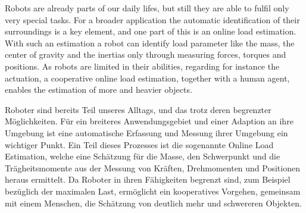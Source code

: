 \documentclass[a4paper,twoside, openright,12pt]{report}
\newenvironment{abstractpage}
  {\vspace*{\fill}\thispagestyle{empty}}
  {\vfill}%
\renewenvironment{abstract}[1]
  {\bigskip\selectlanguage{#1}%
   \begin{center}\bfseries\abstractname\end{center}}
  {\par\bigskip}
\begin{document}
\begin{abstractpage}
	\begin{abstract}{english}
	    Robots are already parts of our daily lifes, but still they are able to fulfil only very special tasks. For a broader application the automatic identification of their surroundings is a key element, and one part of this is an online load estimation. With such an estimation a robot can identify load parameter like the mass, the center of gravity and the inertias only through measuring forces, torques and positions. As robots are limited in their abilities, regarding for instance the actuation, a cooperative online load estimation, together with a human agent, enables the estimation of more and heavier objects.
	\end{abstract}
	\vspace{2cm}
	\begin{abstract}{ngerman}
	    Roboter sind bereits Teil unseres Alltags, und das trotz deren begrenzter M\"oglichkeiten. F\"ur ein breiteres Anwendungsgebiet und einer Adaption an ihre Umgebung ist eine automatische Erfassung und Messung ihrer Umgebung ein wichtiger Punkt. Ein Teil dieses Prozesses ist die sogenannte Online Load Estimation, welche eine Sch\"atzung f\"ur die Masse, den Schwerpunkt und die Tr\"agheitsmomente aus der Messung von Kr\"aften, Drehmomenten und Positionen heraus ermittelt. Da Roboter in ihren F\"ahigkeiten begrenzt sind, zum Beispiel bez\"uglich der maximalen Last, erm\"oglicht ein kooperatives Vorgehen, gemeinsam mit einem Menschen, die Sch\"atzung von deutlich mehr und schwereren Objekten.
	\end{abstract}
\end{abstractpage}

\pagestyle{fancy}

\tableofcontents 















\cleardoublepage
{} 
\listoffigures 	 %


\cleardoublepage
{}


\end{document}
